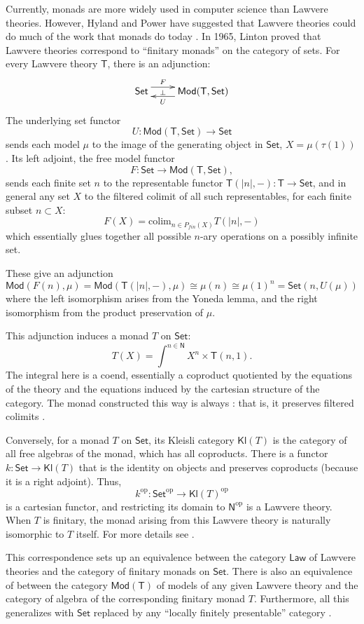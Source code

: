 \documentclass{amsart}
\newcommand{\define}[1]{{\bf \boldmath{#1}}}
\theoremstyle{definition}
\newcommand{\Set}{\mathsf{Set}}
\newcommand{\Law}{\mathsf{Law}}
\newcommand{\Mod}{\mathsf{Mod}}
\newcommand{\NN}{\mathsf{N}}
\newcommand{\T}{\mathsf{T}}
\newcommand{\Kl}{\mathsf{Kl}}
\newcommand{\op}{\mathrm{op}}
\newcommand{\maps}{\colon}
\begin{document}
Currently, monads are more widely used in computer science than Lawvere theories.  However, Hyland and Power have suggested that Lawvere theories could do much of the work that monads do today \cite{hylandpower}. In 1965, Linton \cite{linton} proved that Lawvere theories correspond to ``finitary monads'' on the category of sets.   For every Lawvere theory $\T$, there is an adjunction:
\[
\xymatrix{
\Set \ar@<1.1ex>[r]^-F_-\bot &
\Mod(\T,\Set) \ar@<1.1ex>[l]^-U
}\]
The underlying set functor 
\[  U\maps \Mod(\T,\Set) \to \Set \]
sends each model $\mu$ to the image of the generating object in $\Set$, $X = \mu(\tau(1))$. 
Its left adjoint, the free model functor 
\[       F\maps\Set \to \Mod(\T,\Set), \]
sends each finite set $n$ to the representable functor $\T(|n|,-)\maps\T \to \Set$, and in general any set $X$ to the filtered colimit of all such representables, for each finite subset $n \subset X$: $$F(X) = \mathrm{colim}_{n\in P_{fin}(X)} T(|n|,-)$$ which essentially glues together all possible $n$-ary operations on a possibly infinite set.

These give an adjunction
\[   \Mod(F(n),\mu) = \Mod(\T(|n|,-),\mu) \cong \mu(n) \cong \mu(1)^n = \Set(n,U(\mu))\] 
where the left isomorphism arises from the Yoneda lemma, and the right isomorphism from the product preservation of $\mu$. 

This adjunction induces a monad $T$ on $\Set$:
\begin{equation}
T(X) = \int^{n\in \NN} X^n \times \T(n,1).
\end{equation}
The integral here is a coend, essentially a coproduct quotiented by the equations of the theory and the equations induced by the cartesian structure of the category.    The monad constructed this way is always \define{finitary}: that is, it preserves filtered colimits \cite{adamekrosicky}.

Conversely, for a monad $T$ on $\Set$, its Kleisli category $\Kl(T)$ is the category of all free algebras of the monad, which has all coproducts. There is a functor $k\maps \Set \to \Kl(T)$ that is the identity on objects and preserves coproducts (because it is a right adjoint).  Thus,
\[ k^{\op}\maps \Set^{\op} \to \Kl(T)^{\op} \]
is a cartesian functor, and restricting its domain to $\NN^{\op}$ is a Lawvere theory. 
When $T$ is finitary, the monad arising from this Lawvere theory is naturally isomorphic to $T$ itself.  For more details see \cite{barrwells,lawvere,milewski}.

This correspondence sets up an equivalence between the category $\Law$ of Lawvere theories and the category of finitary monads on $\Set$.  There is also an equivalence of between the category $\Mod(\T)$ of models of any given Lawvere theory and the category of algebra of the corresponding finitary monad $T$.  Furthermore, all this generalizes with $\Set$ replaced by any ``locally finitely presentable'' category \cite{adamekrosicky}.   
\end{document}
